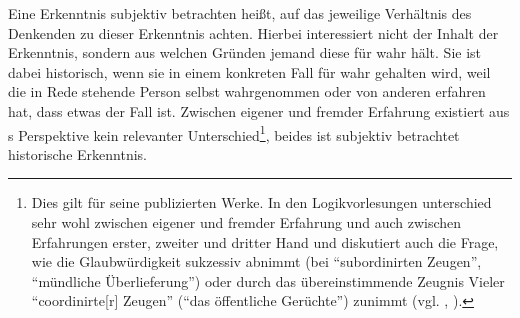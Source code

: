 Eine Erkenntnis subjektiv betrachten heißt, auf das jeweilige
Verhältnis des Denkenden zu dieser Erkenntnis achten. Hierbei interessiert nicht
der Inhalt der Erkenntnis, sondern aus welchen Gründen jemand diese für wahr
hält. Sie ist dabei historisch, wenn sie in einem konkreten Fall für wahr
gehalten wird, weil die in Rede stehende Person selbst wahrgenommen oder von
anderen erfahren hat, dass etwas der Fall ist. Zwischen eigener und fremder Erfahrung existiert aus
s Perspektive kein relevanter Unterschied\footnote{Dies gilt für
seine publizierten Werke. In den Logikvorlesungen unterschied  sehr
wohl zwischen eigener und fremder Erfahrung und auch zwischen Erfahrungen
erster, zweiter und dritter Hand und diskutiert auch die Frage, wie die
Glaubwürdigkeit sukzessiv abnimmt (bei \enquote{subordinirten Zeugen},
\enquote{mündliche Überlieferung}) oder durch das übereinstimmende Zeugnis
Vieler \enquote{coordinirte[r] Zeugen} (\enquote{das öffentliche Gerüchte})
zunimmt \mkbibparens{vgl. \cite{Kant:LogikPhilippi1966}, \cite[][XXIV:
450.20-28]{Kant:GesammelteWerke1900ff.}}.}, beides ist subjektiv betrachtet
historische Erkenntnis.

